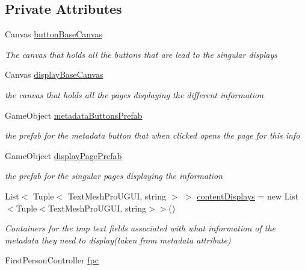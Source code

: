 \subsection*{Private Attributes}
\begin{DoxyCompactItemize}
\item 
Canvas \mbox{\hyperlink{class_meta_data_display_aafcc610f0d96f968cda456a0a4ec539f}{button\+Base\+Canvas}}
\begin{DoxyCompactList}\small\item\em The canvas that holds all the buttons that are lead to the singular displays \end{DoxyCompactList}\item 
Canvas \mbox{\hyperlink{class_meta_data_display_ab6cf1e74b49c27d63fcc863d1be99aa6}{display\+Base\+Canvas}}
\begin{DoxyCompactList}\small\item\em the canvas that holds all the pages displaying the different information \end{DoxyCompactList}\item 
Game\+Object \mbox{\hyperlink{class_meta_data_display_a82ed5fe18cb79fe0fedc8f8a4eb082d7}{metadata\+Buttons\+Prefab}}
\begin{DoxyCompactList}\small\item\em the prefab for the metadata button that when clicked opens the page for this info \end{DoxyCompactList}\item 
Game\+Object \mbox{\hyperlink{class_meta_data_display_af81a664bb7d39381b2dd82da5b67ec94}{display\+Page\+Prefab}}
\begin{DoxyCompactList}\small\item\em the prefab for the singular pages displaying the information \end{DoxyCompactList}\item 
List$<$ Tuple$<$ Text\+Mesh\+Pro\+U\+G\+UI, string $>$ $>$ \mbox{\hyperlink{class_meta_data_display_a347d0dacfa16900eb101f45904a89f73}{content\+Displays}} = new List$<$Tuple$<$Text\+Mesh\+Pro\+U\+G\+UI, string$>$$>$()
\begin{DoxyCompactList}\small\item\em Containers for the tmp text fields associated with what information of the metadata they need to display(taken from metadata attribute) \end{DoxyCompactList}\item 
First\+Person\+Controller \mbox{\hyperlink{class_meta_data_display_a91e82b2cdd0e114b1616ef8ced5773bc}{fpc}}
$$
\end{DoxyCompactItemize}
